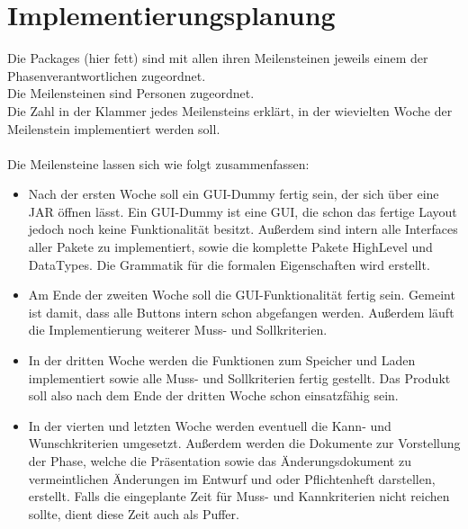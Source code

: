 \documentclass[a4paper]{scrreprt}
\begin{document}
\chapter{Implementierungsplanung}
Die Packages (hier fett) sind mit allen ihren Meilensteinen jeweils einem der Phasenverantwortlichen zugeordnet. \\
Die Meilensteinen sind Personen zugeordnet. \\
Die Zahl in der Klammer jedes Meilensteins erklärt, in der wievielten Woche der Meilenstein implementiert werden soll. \\\\

Die Meilensteine lassen sich wie folgt zusammenfassen: \\
\begin{itemize} 
\item Nach der ersten Woche soll ein GUI-Dummy fertig sein, der sich über eine JAR öffnen lässt. Ein GUI-Dummy ist eine GUI, die schon das fertige Layout jedoch noch keine Funktionalität besitzt. Außerdem sind intern alle Interfaces aller Pakete zu implementiert, sowie die komplette Pakete HighLevel und DataTypes. Die Grammatik für die formalen Eigenschaften wird erstellt.
\item Am Ende der zweiten Woche soll die GUI-Funktionalität fertig sein. Gemeint ist damit, dass alle Buttons intern schon abgefangen werden. Außerdem läuft die Implementierung weiterer Muss- und Sollkriterien. 
\item In der dritten Woche werden die Funktionen zum Speicher und Laden implementiert sowie alle Muss- und Sollkriterien fertig gestellt. Das Produkt soll also nach dem Ende der dritten Woche schon einsatzfähig sein.
\item In der vierten und letzten Woche werden eventuell die Kann- und Wunschkriterien umgesetzt. Außerdem werden die Dokumente zur Vorstellung der Phase, welche die Präsentation sowie das Änderungsdokument zu vermeintlichen Änderungen im Entwurf und oder Pflichtenheft darstellen, erstellt. Falls die eingeplante Zeit für Muss- und Kannkriterien nicht reichen sollte, dient diese Zeit auch als Puffer.


\end{itemize} 
\end{document}
